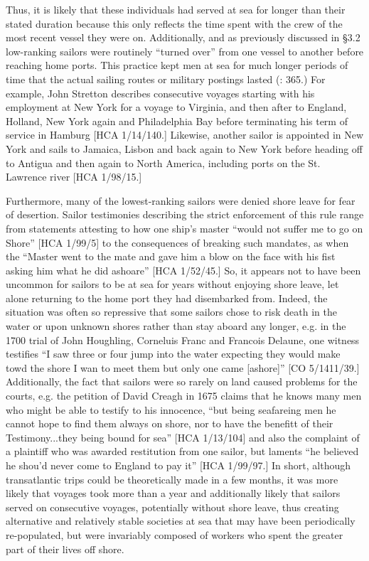 Thus, it is likely that these individuals had served at sea for longer than their stated duration because this only reflects the time spent with the crew of the most recent vessel they were on. Additionally, and as previously discussed in §3.2 low-ranking sailors were routinely “turned over” from one vessel to another before reaching home ports. This practice kept men at sea for much longer periods of time that the actual sailing routes or military postings lasted (\citealt{AdkinsAdkins2008}: 365.) For example, John Stretton describes consecutive voyages starting with his employment at New York for a voyage to Virginia, and then after to England, Holland, New York again and Philadelphia Bay before terminating his term of service in Hamburg [HCA 1/14/140.] Likewise, another sailor is appointed in New York and sails to Jamaica, Lisbon and back again to New York before heading off to Antigua and then again to North America, including ports on the St. Lawrence river [HCA 1/98/15.] 

Furthermore, many of the lowest-ranking sailors were denied shore leave for fear of desertion. Sailor testimonies describing the strict enforcement of this rule range from statements attesting to how one ship’s master “would not suffer me to go on Shore” [HCA 1/99/5] to the consequences of breaking such mandates, as when the “Master went to the mate and gave him a blow on the face with his fist asking him what he did ashoare” [HCA 1/52/45.] So, it appears not to have been uncommon for sailors to be at sea for years without enjoying shore leave, let alone returning to the home port they had disembarked from. Indeed, the situation was often so repressive that some sailors chose to risk death in the water or upon unknown shores rather than stay aboard any longer, e.g. in the 1700 trial of John Houghling, Corneluis Franc and Francois Delaune, one witness testifies “I saw three or four jump into the water expecting they would make towd the shore I wan to meet them but only one came [ashore]” [CO 5/1411/39.] Additionally, the fact that sailors were so rarely on land caused problems for the courts, e.g. the petition of David Creagh in 1675 claims that he knows many men who might be able to testify to his innocence, “but being seafareing men he cannot hope to find them always on shore, nor to have the benefitt of their Testimony...they being bound for sea” [HCA 1/13/104] and also the complaint of a plaintiff who was awarded restitution from one sailor, but laments “he believed he shou’d never come to England to pay it”  [HCA 1/99/97.] In short, although transatlantic trips could be theoretically made in a few months, it was more likely that voyages took more than a year and additionally likely that sailors served on consecutive voyages, potentially without shore leave, thus creating alternative and relatively stable societies at sea that may have been periodically re-populated, but were invariably composed of workers who spent the greater part of their lives off shore. 

